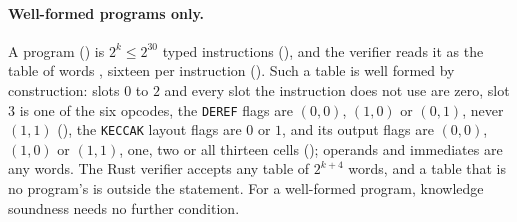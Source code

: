\documentclass[11pt]{article}
\begin{document}
\paragraph{Well-formed programs only.} A program () is $2^{k} \le 2^{30}$ typed instructions (), and the verifier reads it as the table of words , sixteen per instruction (). Such a table is well formed by construction: slots $0$ to $2$ and every slot the instruction does not use are zero, slot $3$ is one of the six opcodes, the \texttt{DEREF} flags are $(0,0)$, $(1,0)$ or $(0,1)$, never $(1,1)$ (), the \texttt{KECCAK} layout flags are $0$ or $1$, and its output flags are $(0,0)$, $(1,0)$ or $(1,1)$, one, two or all thirteen cells (); operands and immediates are any words. The Rust verifier accepts any table of $2^{k+4}$ words, and a table that is no program's  is outside the statement. For a well-formed program, knowledge soundness needs no further condition.
\end{document}
